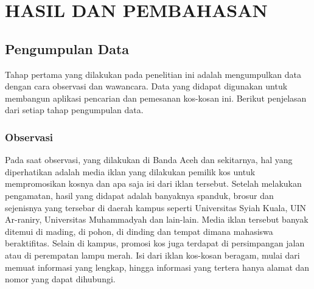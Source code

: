 
\chapter{HASIL DAN PEMBAHASAN}
	\section{Pengumpulan Data}
	

	Tahap pertama yang dilakukan pada penelitian ini adalah mengumpulkan data dengan cara observasi dan wawancara. Data yang didapat digunakan untuk membangun aplikasi pencarian dan pemesanan kos-kosan ini. Berikut penjelasan dari setiap tahap pengumpulan data.
	
	\subsection{Observasi}
	Pada saat observasi, yang dilakukan di Banda Aceh dan sekitarnya, hal yang diperhatikan adalah media iklan yang dilakukan pemilik kos untuk mempromosikan kosnya dan apa saja isi dari iklan tersebut.  Setelah melakukan pengamatan, hasil yang didapat adalah banyaknya spanduk, brosur dan sejenisnya yang tersebar di daerah kampus seperti Universitas Syiah Kuala, UIN Ar-raniry, Universitas Muhammadyah dan lain-lain. Media iklan tersebut banyak ditemui di mading, di pohon, di dinding dan tempat dimana mahasiswa beraktifitas. Selain di kampus, promosi kos juga terdapat di persimpangan jalan atau di perempatan lampu merah. Isi dari iklan kos-kosan beragam, mulai dari memuat informasi yang lengkap, hingga informasi yang tertera hanya alamat dan nomor yang dapat dihubungi. 
	
